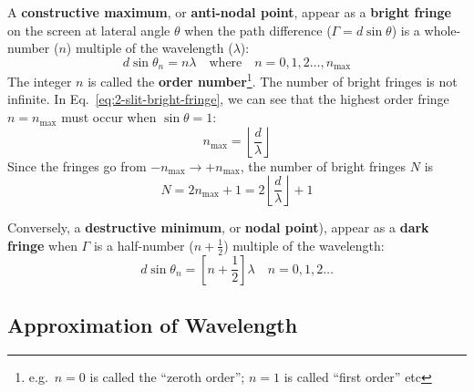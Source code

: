 A \textbf{constructive maximum}, or \textbf{anti-nodal point}, appear as a
\textbf{bright fringe} on the screen at lateral angle $\theta$ when the path
difference ($\Gamma=d\sin\theta$) is a whole-number ($n$) multiple of the
wavelength ($\lambda$):
\begin{equation}
  \boxed{
    d\sin\theta_n = n\lambda
  }
  \quad\text{where}\quad
  n=0,1,2\ldots,n_\text{max}
  \label{eq:2-slit-bright-fringe}
\end{equation}
The integer $n$ is called the \textbf{order number}\footnote{e.g.\ $n=0$ is
called the ``zeroth order''; $n=1$ is called ``first order'' etc}. The number
of bright fringes is not infinite. In Eq.~\ref{eq:2-slit-bright-fringe}, we
can see that the highest order fringe $n=n_\text{max}$ must occur when
$\sin\theta=1$:
\begin{equation}
  n_\text{max}=\left\lfloor\frac d\lambda\right\rfloor
\end{equation}
Since the fringes go from $-n_\text{max}\longrightarrow+n_\text{max}$, the
number of bright fringes $N$ is
\begin{equation}
  \boxed{
    N=2n_\text{max}+1=2\left\lfloor\frac d\lambda\right\rfloor+1
  }
  \label{eq:bright-fringes}
\end{equation}


Conversely, a \textbf{destructive minimum}, or \textbf{nodal point}), appear as
a \textbf{dark fringe} when $\Gamma$ is a half-number ($n+\frac12$) multiple of
the wavelength:
\begin{equation}
  \boxed{
    d\sin\theta_n = \left[n+\frac12\right]\lambda
  }
  \quad n=0,1,2\ldots
  \label{eq:dark-fringes}
\end{equation}




\subsection{Approximation of Wavelength}

